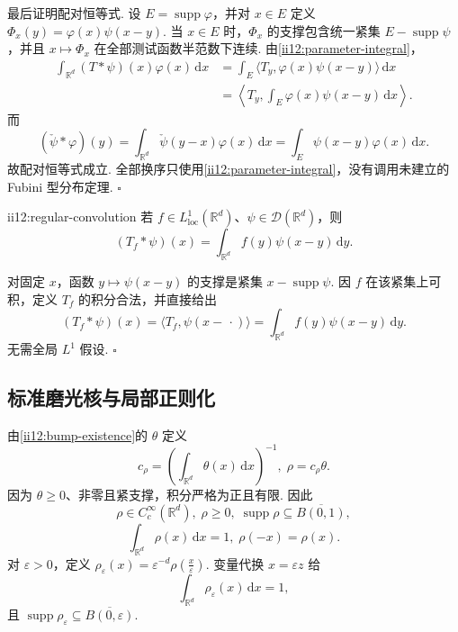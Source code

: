 \begin{FAProof}
最后证明配对恒等式. 设 \(\displaystyle E=\operatorname{supp}\varphi\)，并对 \(\displaystyle x\in E\) 定义 \(\displaystyle \Phi_x(y)=\varphi(x)\psi(x-y).\)
当 \(\displaystyle x\in E\) 时，\(\displaystyle\Phi_x\) 的支撑包含统一紧集 \(\displaystyle E-\operatorname{supp}\psi\)，并且 \(\displaystyle x\mapsto\Phi_x\) 在全部测试函数半范数下连续. 由\autoref{ii12:parameter-integral}，
\[
\begin{aligned}
\int_{\mathbb R^d}(T*\psi)(x)\varphi(x)\,\mathrm{d}x
&=\int_E\langle T_y,\varphi(x)\psi(x-y)\rangle\,\mathrm{d}x\\
&=\left\langle T_y,\int_E\varphi(x)\psi(x-y)\,\mathrm{d}x\right\rangle.
\end{aligned}
\]
而
\[
(\check\psi*\varphi)(y)
=
\int_{\mathbb R^d}\check\psi(y-x)\varphi(x)\,\mathrm{d}x
=
\int_E\psi(x-y)\varphi(x)\,\mathrm{d}x.
\]
故配对恒等式成立. 全部换序只使用\autoref{ii12:parameter-integral}，没有调用未建立的 Fubini 型分布定理.
\hfill\(\square\)
\end{FAProof}

\begin{FAProposition}[B][正则分布的卷积相容性]{ii12:regular-convolution}
若 \(\displaystyle f\in L^1_{\mathrm{loc}}(\mathbb R^d)\)、\(\displaystyle\psi\in\mathcal D(\mathbb R^d)\)，则
\[
(T_f*\psi)(x)
=
\int_{\mathbb R^d}f(y)\psi(x-y)\,\mathrm{d}y.
\]
\end{FAProposition}

\begin{FAProof}
对固定 \(\displaystyle x\)，函数 \(\displaystyle y\mapsto\psi(x-y)\) 的支撑是紧集 \(\displaystyle x-\operatorname{supp}\psi\). 因 \(\displaystyle f\) 在该紧集上可积，定义 \(\displaystyle T_f\) 的积分合法，并直接给出
\[
(T_f*\psi)(x)
=
\langle T_f,\psi(x-\,\cdot)\rangle
=
\int_{\mathbb R^d}f(y)\psi(x-y)\,\mathrm{d}y.
\]
无需全局 \(\displaystyle L^1\) 假设.
\hfill\(\square\)
\end{FAProof}

\subsection{标准磨光核与局部正则化}

由\autoref{ii12:bump-existence}的 \(\displaystyle\theta\) 定义
\[
c_\rho
=
\left(\int_{\mathbb R^d}\theta(x)\,\mathrm{d}x\right)^{-1},
\;
\rho=c_\rho\theta.
\]
因为 \(\displaystyle\theta\geqslant0\)、非零且紧支撑，积分严格为正且有限. 因此
\[
\rho\in C_c^\infty(\mathbb R^d),
\;
\rho\geqslant0,
\;
\operatorname{supp}\rho\subseteq\overline{B(0,1)},
\]
\[
\int_{\mathbb R^d}\rho(x)\,\mathrm{d}x=1,
\;
\rho(-x)=\rho(x).
\]
对 \(\displaystyle\varepsilon>0\)，定义 \(\displaystyle \rho_\varepsilon(x) = \varepsilon^{-d}\rho(\frac{x}{\varepsilon}).\)
变量代换 \(\displaystyle x=\varepsilon z\) 给
\[
\int_{\mathbb R^d}\rho_\varepsilon(x)\,\mathrm{d}x=1,
\]
且 \(\displaystyle \operatorname{supp}\rho_\varepsilon \subseteq \overline{B(0,\varepsilon)}.\)

